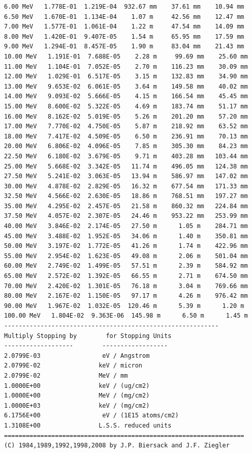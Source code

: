 \documentclass [11pt,a4paper,dvipdfmx] {jarticle}
\begin{document}
\begin{lstlisting}[caption={SRIMの出力ファイルの例。},basicstyle=\fontsize{6}{6}\ttfamily,identifierstyle=\fontsize{6}{6},numberstyle={\tiny},columns=fixed]
6.00 MeV   1.778E-01  1.219E-04  932.67 mm    37.61 mm    10.94 mm  
6.50 MeV   1.670E-01  1.134E-04    1.07 m     42.56 mm    12.47 mm  
7.00 MeV   1.577E-01  1.061E-04    1.22 m     47.54 mm    14.09 mm  
8.00 MeV   1.420E-01  9.407E-05    1.54 m     65.95 mm    17.59 mm  
9.00 MeV   1.294E-01  8.457E-05    1.90 m     83.04 mm    21.43 mm  
10.00 MeV   1.191E-01  7.688E-05    2.28 m     99.69 mm    25.60 mm  
11.00 MeV   1.104E-01  7.052E-05    2.70 m    116.23 mm    30.09 mm  
12.00 MeV   1.029E-01  6.517E-05    3.15 m    132.83 mm    34.90 mm  
13.00 MeV   9.653E-02  6.061E-05    3.64 m    149.58 mm    40.02 mm  
14.00 MeV   9.093E-02  5.666E-05    4.15 m    166.54 mm    45.45 mm  
15.00 MeV   8.600E-02  5.322E-05    4.69 m    183.74 mm    51.17 mm  
16.00 MeV   8.162E-02  5.019E-05    5.26 m    201.20 mm    57.20 mm  
17.00 MeV   7.770E-02  4.750E-05    5.87 m    218.92 mm    63.52 mm  
18.00 MeV   7.417E-02  4.509E-05    6.50 m    236.91 mm    70.13 mm  
20.00 MeV   6.806E-02  4.096E-05    7.85 m    305.30 mm    84.23 mm  
22.50 MeV   6.180E-02  3.679E-05    9.71 m    403.28 mm   103.44 mm  
25.00 MeV   5.668E-02  3.342E-05   11.74 m    496.05 mm   124.38 mm  
27.50 MeV   5.241E-02  3.063E-05   13.94 m    586.97 mm   147.02 mm  
30.00 MeV   4.878E-02  2.829E-05   16.32 m    677.54 mm   171.33 mm  
32.50 MeV   4.566E-02  2.630E-05   18.86 m    768.51 mm   197.27 mm  
35.00 MeV   4.295E-02  2.457E-05   21.58 m    860.32 mm   224.84 mm  
37.50 MeV   4.057E-02  2.307E-05   24.46 m    953.22 mm   253.99 mm  
40.00 MeV   3.846E-02  2.174E-05   27.50 m      1.05 m    284.71 mm  
45.00 MeV   3.488E-02  1.952E-05   34.06 m      1.40 m    350.81 mm  
50.00 MeV   3.197E-02  1.772E-05   41.26 m      1.74 m    422.96 mm  
55.00 MeV   2.954E-02  1.623E-05   49.08 m      2.06 m    501.04 mm  
60.00 MeV   2.749E-02  1.499E-05   57.51 m      2.39 m    584.92 mm  
65.00 MeV   2.572E-02  1.392E-05   66.55 m      2.71 m    674.50 mm  
70.00 MeV   2.420E-02  1.301E-05   76.18 m      3.04 m    769.66 mm  
80.00 MeV   2.167E-02  1.150E-05   97.17 m      4.26 m    976.42 mm  
90.00 MeV   1.967E-02  1.032E-05  120.46 m      5.39 m      1.20 m   
100.00 MeV   1.804E-02  9.363E-06  145.98 m      6.50 m      1.45 m   
-----------------------------------------------------------
Multiply Stopping by        for Stopping Units
-------------------        ------------------
2.0799E-03                 eV / Angstrom 
2.0799E-02                keV / micron   
2.0799E-02                MeV / mm       
1.0000E+00                keV / (ug/cm2) 
1.0000E+00                MeV / (mg/cm2) 
1.0000E+03                keV / (mg/cm2) 
6.1756E+00                 eV / (1E15 atoms/cm2)
1.3108E+00                L.S.S. reduced units
==================================================================
(C) 1984,1989,1992,1998,2008 by J.P. Biersack and J.F. Ziegler

\end{lstlisting}
\end{document}
